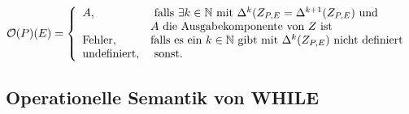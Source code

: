 $\mathcal{O}(P)(E)=\left\lbrace\begin{array}{l l} A\text{,}&\text{ falls }\exists k\in\mathbb{N} \text{ mit } \Delta^k(Z_{P,E}=\Delta^{k+1}(Z_{P,E})\text{ und }\\&A\text{ die Ausgabekomponente von }Z\text{ ist}\\
\text{Fehler,}& \text{falls es ein }k\in\mathbb{N}\text{ gibt mit }\Delta^k(Z_{P,E}) \text{ nicht definiert}\\
\text{undefiniert,}&\text{ sonst.}\\
\end{array}\right.$

\subsection{Operationelle Semantik von WHILE}
